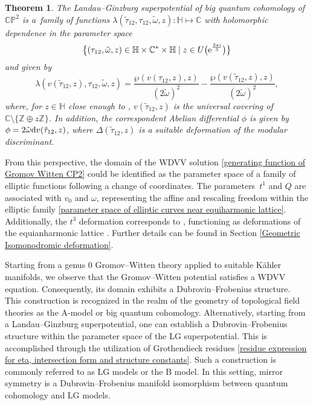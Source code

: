 \documentclass[pdftex]{sigma}
\numberwithin{equation}{section}
\newtheorem{Theorem}{Theorem}[section]
\begin{document}
\begin{Theorem}
The Landau--Ginzburg superpotential of big quantum cohomology of $\mathbb{CP}^2$ is a~family of functions
$\lambda(\tilde\tau_{12}, \tau_{12}, \tilde\omega,z)\colon \mathbb{H} \mapsto \mathbb{C}$
with holomorphic dependence in the parameter space
\begin{gather}\label{parameter space of elliptic curves near equiharmonic lattice}
\bigl\{(\tau_{12},\tilde\omega,z) \in \mathbb{H}\times\mathbb{C}^{*}\times\mathbb{H} \mid z \in U\bigl({\rm e}^{\frac{2\pi {\rm i}}{3}}\bigr) \bigr\}
\end{gather}
and given by
\[%
\lambda(v(\tilde\tau_{12},z),\tau_{12},\tilde\omega,z)=\frac{\wp(v(\tau_{12},z),z)}{\left(2\tilde\omega\right)^2}-\frac{\wp(v(\tilde\tau_{12},z),z)}{\left(2\tilde\omega\right)^2},
\]
where, for $z\in \mathbb{H}$ close enough to , $v(\tilde\tau_{12},z)$ is the universal covering of $\mathbb{C}\setminus\{\mathbb{Z}\oplus z\mathbb{Z} \}$.
 In addition, the correspondent Abelian differential $\phi$ is given by
$\phi= 2\tilde\omega {\rm d}v(\tilde\tau_{12},z)$,
where $\Delta(\tilde\tau_{12},z)$ is a suitable deformation of the modular discriminant.
\end{Theorem}

From this perspective, the domain of the WDVV solution \eqref{generating function of Gromov Witten CP2} could be identified as the parameter space of a family of elliptic functions following a change of coordinates. The parameters~$t^1$ and $Q$ are associated with $v_0$ and $\omega$, representing the affine and rescaling freedom within the elliptic family \eqref{parameter space of elliptic curves near equiharmonic lattice}. Additionally, the $t^3$ deformation corresponds to , functioning as deformations of the equianharmonic lattice . Further details can be found in Section \ref{Geometric Isomonodromic deformation}.

Starting from a genus $0$ Gromov--Witten theory applied to suitable K\"ahler manifolds, we observe that the Gromov--Witten potential satisfies a WDVV equation. Consequently, its domain exhibits a Dubrovin--Frobenius structure. This construction is recognized in the realm of the geometry of topological field theories as the A-model or big quantum cohomology. Alternatively, starting from a Landau--Ginzburg superpotential, one can establish a Dubrovin--Frobenius structure within the parameter space of the LG superpotential. This is accomplished through the utilization of Grothendieck residues \eqref{residue expression for eta, intersection form and structure constants}. Such a construction is commonly referred to as LG models or the B model. In this setting, mirror symmetry is a Dubrovin--Frobenius manifold isomorphism between quantum cohomology and LG models.
\end{document}
